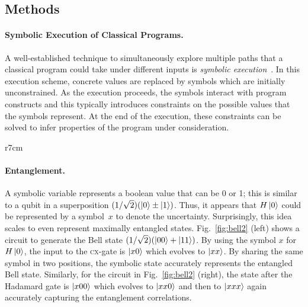 \documentclass{article}
\newcommand{\cx}{\textsc{cx}}
\begin{document}
\begin{refsection}
\section*{Methods}

\paragraph*{Symbolic Execution of Classical Programs.}
A well-established technique to simultaneously explore multiple paths
that a classical program could take under different inputs is
\emph{symbolic
  execution}~\cite{10.1145/390016.808445,10.1145/360248.360252,howden,10.1145/800191.805647,10.1145/3182657}. In
this execution scheme, concrete values are replaced by symbols which are
initially unconstrained. As the execution proceeds, the symbols
interact with program constructs and this typically introduces
constraints on the possible values that the symbols represent. At the
end of the execution, these constraints can be solved to infer
properties of the program under consideration. 

\begin{wrapfigure}{r}{7cm}
\begin{center}
\qquad
{}
\end{center}
\caption{\label{fig:bell2}Bell and GHZ States}
\end{wrapfigure}
\paragraph*{Entanglement.}
A symbolic variable represents a boolean value that can be 0 or 1;
this is similar to a qubit in a superposition $(1/\sqrt{2}) (\ket{0}
\pm \ket{1})$. Thus, it appears that $H\ket{0}$ could be represented
by a symbol~$x$ to denote the uncertainty. Surprisingly, this idea
scales to even represent maximally entangled
states. Fig.~\ref{fig:bell2} (left) shows a circuit to generate the Bell
state $(1/\sqrt{2}) (\ket{00} + \ket{11})$. By using the symbol $x$
for $H\ket{0}$, the input to the \cx-gate is $\ket{x0}$ which
evolves to $\ket{xx}$. By sharing the same symbol in two positions,
the symbolic state accurately represents the entangled Bell
state. Similarly, for the circuit in Fig.~\ref{fig:bell2} (right), the
state after the Hadamard gate is $\ket{x00}$ which evolves to
$\ket{xx0}$ and then to $\ket{xxx}$ again accurately capturing the
entanglement correlations.


\end{refsection}
\end{document}
